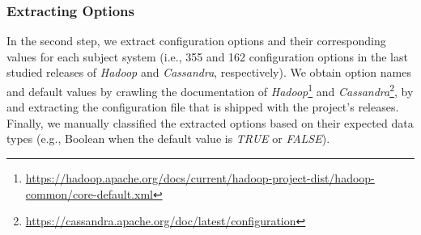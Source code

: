 \subsubsection{Extracting Options}

In the second step, we extract configuration options and their corresponding values for each subject system (i.e., 355 and 162 configuration options in the last studied releases of \emph{Hadoop} and \emph{Cassandra}, respectively). %
We obtain option names and default values by crawling the documentation of \emph{Hadoop}\footnote{\url{https://hadoop.apache.org/docs/current/hadoop-project-dist/hadoop-common/core-default.xml}} and \emph{Cassandra}\footnote{\url{https://cassandra.apache.org/doc/latest/configuration}}, by and extracting the configuration file that is shipped with the project's releases. Finally, we manually classified the extracted options based on their expected data types (e.g., Boolean when the default value is \emph{TRUE} or \emph{FALSE}).


